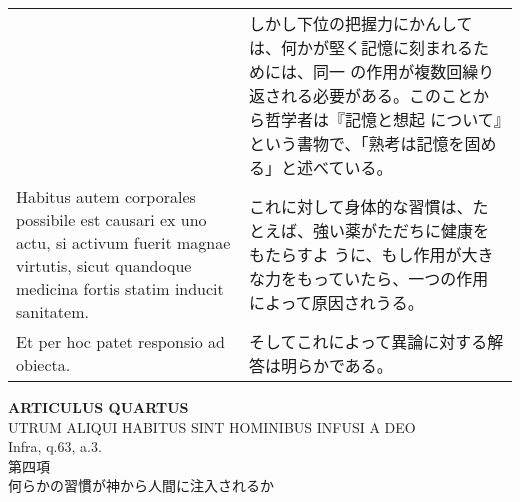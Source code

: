 \documentclass[10pt]{jsarticle} %
\begin{document}
\begin{longtable}{p{21em}p{21em}}
&

しかし下位の把握力にかんしては、何かが堅く記憶に刻まれるためには、同一
の作用が複数回繰り返される必要がある。このことから哲学者は『記憶と想起
について』という書物で、「熟考は記憶を固める」と述べている。

\\

Habitus autem corporales possibile est causari ex uno actu, si activum
fuerit magnae virtutis, sicut quandoque medicina fortis statim inducit
sanitatem.



&

これに対して身体的な習慣は、たとえば、強い薬がただちに健康をもたらすよ
うに、もし作用が大きな力をもっていたら、一つの作用によって原因されうる。

\\



Et per hoc patet responsio ad obiecta.

&

そしてこれによって異論に対する解答は明らかである。

\end{longtable}
\newpage


\begin{center}
{\Large {\bf ARTICULUS QUARTUS}}\\
{\large UTRUM ALIQUI HABITUS SINT HOMINIBUS INFUSI A DEO}\\
{\footnotesize Infra, q.63, a.3.}\\
{\Large 第四項\\何らかの習慣が神から人間に注入されるか}
\end{center}
\end{document}

